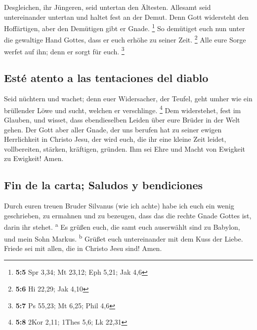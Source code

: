  Desgleichen, ihr Jüngeren, seid untertan den Ältesten.
Allesamt seid untereinander untertan und haltet fest an der Demut. Denn
Gott widersteht den Hoffärtigen, aber den Demütigen gibt er Gnade.
\footnote{\textbf{5:5} Spr 3,34; Mt 23,12; Eph 5,21; Jak 4,6}
 So demütiget euch nun unter die gewaltige Hand Gottes,
dass er euch erhöhe zu seiner Zeit. \footnote{\textbf{5:6} Hi 22,29; Jak
  4,10}  Alle eure Sorge werfet auf ihn; denn er sorgt für
euch. \footnote{\textbf{5:7} Ps 55,23; Mt 6,25; Phil 4,6}

\hypertarget{estuxe9-atento-a-las-tentaciones-del-diablo}{%
\subsection{Esté atento a las tentaciones del
diablo}\label{estuxe9-atento-a-las-tentaciones-del-diablo}}

 Seid nüchtern und wachet; denn euer Widersacher, der
Teufel, geht umher wie ein brüllender Löwe und sucht, welchen er
verschlinge. \footnote{\textbf{5:8} 2Kor 2,11; 1Thes 5,6; Lk 22,31}
 Dem widerstehet, fest im Glauben, und wisset, dass
ebendieselben Leiden über eure Brüder in der Welt gehen. 
Der Gott aber aller Gnade, der uns berufen hat zu seiner ewigen
Herrlichkeit in Christo Jesu, der wird euch, die ihr eine kleine Zeit
leidet, vollbereiten, stärken, kräftigen, gründen.  Ihm
sei Ehre und Macht von Ewigkeit zu Ewigkeit! Amen.

\hypertarget{fin-de-la-carta-saludos-y-bendiciones}{%
\subsection{Fin de la carta; Saludos y
bendiciones}\label{fin-de-la-carta-saludos-y-bendiciones}}

 Durch euren treuen Bruder Silvanus (wie ich achte) habe
ich euch ein wenig geschrieben, zu ermahnen und zu bezeugen, dass das
die rechte Gnade Gottes ist, darin ihr stehet. \textsuperscript{a}
 Es grüßen euch, die samt euch auserwählt sind zu
Babylon, und mein Sohn Markus. \textsuperscript{b} 
Grüßet euch untereinander mit dem Kuss der Liebe. Friede sei mit allen,
die in Christo Jesu sind! Amen.
